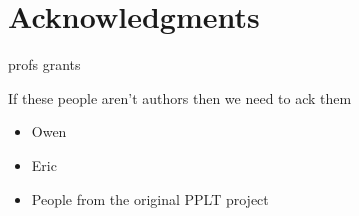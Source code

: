 \section*{Acknowledgments}

profs grants

If these people aren't authors then we need to ack them
\begin{itemize}
    \item Owen 
    \item Eric
    \item People from the original PPLT project
\end{itemize}

